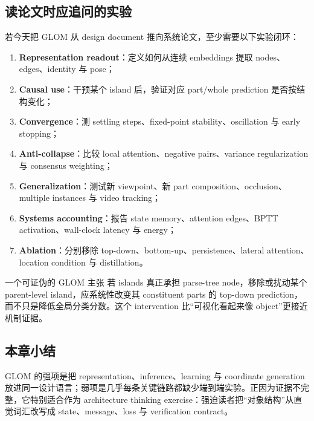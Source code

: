 \subsection{读论文时应追问的实验}

若今天把 GLOM 从 design document 推向系统论文，至少需要以下实验闭环：

\begin{enumerate}
  \item \textbf{Representation readout}：定义如何从连续 embeddings 提取 nodes、edges、identity 与 pose；
  \item \textbf{Causal use}：干预某个 island 后，验证对应 part/whole prediction 是否按结构变化；
  \item \textbf{Convergence}：测 settling steps、fixed-point stability、oscillation 与 early stopping；
  \item \textbf{Anti-collapse}：比较 local attention、negative pairs、variance regularization 与 consensus weighting；
  \item \textbf{Generalization}：测试新 viewpoint、新 part composition、occlusion、multiple instances 与 video tracking；
  \item \textbf{Systems accounting}：报告 state memory、attention edges、BPTT activation、wall-clock latency 与 energy；
  \item \textbf{Ablation}：分别移除 top-down、bottom-up、persistence、lateral attention、location condition 与 distillation。
\end{enumerate}

\begin{importantbox}{一个可证伪的 GLOM 主张}
若 islands 真正承担 parse-tree node，移除或扰动某个 parent-level island，应系统性改变其 constituent parts 的 top-down prediction，而不只是降低全局分类分数。这个 intervention 比“可视化看起来像 object”更接近机制证据。
\end{importantbox}

\subsection{本章小结}

GLOM 的强项是把 representation、inference、learning 与 coordinate generation 放进同一设计语言；弱项是几乎每条关键链路都缺少端到端实验。正因为证据不完整，它特别适合作为 architecture thinking exercise：强迫读者把“对象结构”从直觉词汇改写成 state、message、loss 与 verification contract。

